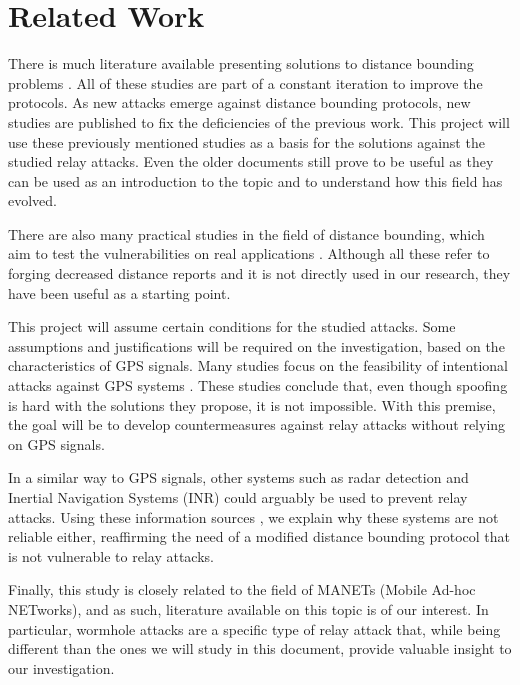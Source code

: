 \documentclass{article}
\begin{document}
\section{Related Work}
\label{sec:relatedwork}

There is much literature available presenting solutions to distance bounding problems \cite{brands1994distance, tu2007rfid, rasmussen2010realization}. All of these studies are part of a constant iteration to improve the protocols. As new attacks emerge against distance bounding protocols, new studies are published to fix the deficiencies of the previous work. This project will use these previously mentioned studies as a basis for the solutions against the studied relay attacks. Even the older documents still prove to be useful as they can be used as an introduction to the topic and to understand how this field has evolved.

There are also many practical studies in the field of distance bounding, which aim to test the vulnerabilities on real applications \cite{francillon2011relay, francis2010practical, hancke2005practical, markantonakis2012practical, vandenbreekel2014relay}. Although all these refer to forging decreased distance reports and it is not directly used in our research, they have been useful as a starting point.

This project will assume certain conditions for the studied attacks. Some assumptions and justifications will be required on the investigation, based on the characteristics of GPS signals. Many studies focus on the feasibility of intentional attacks against GPS systems \cite{warner2003gps, wen2005countermeasures, jafarnia2012gps}. These studies conclude that, even though spoofing is hard with the solutions they propose, it is not impossible. With this premise, the goal will be to develop countermeasures against relay attacks without relying on GPS signals.

In a similar way to GPS signals, other systems such as radar detection \cite{cadirci2009rf} and Inertial Navigation Systems (INR) \cite{patent:4085440} could arguably be used to prevent relay attacks. Using these information sources \cite{cadirci2009rf, patent:4085440}, we explain why these systems are not reliable either, reaffirming the need of a modified distance bounding protocol that is not vulnerable to relay attacks.

Finally, this study is closely related to the field of MANETs (Mobile Ad-hoc NETworks), and as such, literature available on this topic is of our interest. In particular, wormhole attacks \cite{hu2006wormhole, maheshwari2007detecting, goyal2010literature} are a specific type of relay attack that, while being different than the ones we will study in this document, provide valuable insight to our investigation.
\end{document}
